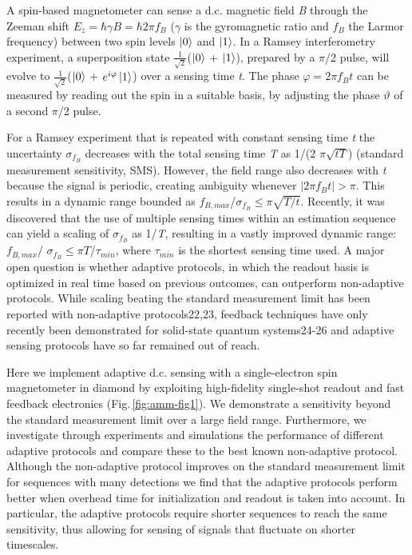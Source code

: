 A spin-based magnetometer can sense a d.c. magnetic field \textit{B} through the Zeeman shift $E_z=\hbar \gamma B = \hbar 2 \pi f_B$ ($\gamma$ is the gyromagnetic ratio and $f_B$ the Larmor frequency) between two spin levels $\left|0\right\rangle$ and $\left|1\right\rangle$. In a Ramsey interferometry experiment, a superposition state  $\frac{1}{\sqrt{2}}$($\left|0\right\rangle$ + $\left|1\right\rangle$), prepared by a $\pi$/2 pulse, will evolve to $\frac{1}{\sqrt{2}}$($\left|0\right\rangle$ + $e^{i\varphi}\left|1\right\rangle$)   over a sensing time \textit{t}. The phase $\varphi = 2 \pi f_B t$ can be measured by reading out the spin in a suitable basis, by adjusting the phase $\vartheta$ of a second $\pi$/2 pulse.


For a Ramsey experiment that is repeated with constant sensing time \textit{t} the uncertainty $\sigma_{f_B}$ decreases with the total sensing time \textit{T} as 1/(2 $\pi \sqrt{tT}$) (standard measurement sensitivity, SMS).  However, the field range also decreases with \textit{t} because the signal is periodic, creating ambiguity whenever $|2\pi f_B t| > \pi $. This results in a dynamic range bounded as  $f_{B,max}$/$\sigma_{f_B}  \le \pi \sqrt{T/t}$.  Recently, it was discovered that the use of multiple sensing times within an estimation sequence can yield a scaling of $\sigma_{f_B}$ as 1/\textit{T}, resulting in a vastly improved dynamic range: $f_{B,max}$/ $\sigma_{f_B} \le  \pi T $/$ \tau_{min}$, where $\tau_{min}$ is the shortest sensing time used. A major open question is whether adaptive protocols, in which the readout basis is optimized in real time based on previous outcomes, can outperform non-adaptive protocols. While scaling beating the standard measurement limit has been reported with non-adaptive protocols22,23, feedback techniques have only recently been demonstrated for solid-state quantum systems24-26 and adaptive sensing protocols have so far remained out of reach.


Here we implement adaptive d.c. sensing with a single-electron spin magnetometer in diamond by exploiting high-fidelity single-shot readout and fast feedback electronics (Fig.\,\ref{fig:amm-fig1}). We demonstrate a sensitivity beyond the standard measurement limit over a large field range. Furthermore, we investigate through experiments and simulations the performance of different adaptive protocols and compare these to the best known non-adaptive protocol. Although the non-adaptive protocol improves on the standard measurement limit for sequences with many detections we find that the adaptive protocols perform better when overhead time for initialization and readout is taken into account. In particular, the adaptive protocols require shorter sequences to reach the same sensitivity, thus allowing for sensing of signals that fluctuate on shorter timescales.

